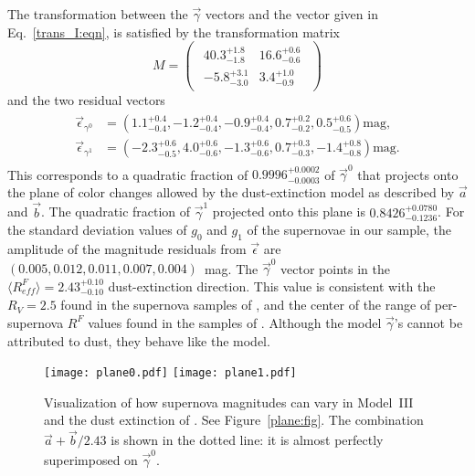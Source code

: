 \documentclass[trackchanges]{aastex62}   	%
\begin{document}
The transformation between the $\vec{\gamma}$  vectors and the    vector given in
Eq.~\ref{trans_I:eqn}, is satisfied by the transformation matrix
\begin{equation}
M=
\begin{pmatrix}
\begin{array}{rr}
40.3^{+1.8}_{-1.8} & 16.6^{+0.6}_{-0.6} \\
-5.8^{+3.1}_{-3.0} & 3.4^{+1.0}_{-0.9}
\end{array}
\end{pmatrix} 
\end{equation}
and the two residual vectors
\begin{align}
\begin{split}
\vec{\epsilon}_{\gamma^0} &=\left(1.1^{+0.4}_{-0.4} , -1.2^{+0.4}_{-0.4} , -0.9^{+0.4}_{-0.4} , 0.7^{+0.2}_{-0.2} , 0.5^{+0.6}_{-0.5}\right) \text{mag}, \\
\vec{\epsilon}_{\gamma^1} & =\left(-2.3^{+0.6}_{-0.5} , 4.0^{+0.6}_{-0.6} , -1.3^{+0.6}_{-0.6} , 0.7^{+0.3}_{-0.3} , -1.4^{+0.8}_{-0.8}\right) \text{mag}.
\end{split}
\label{res_3:eqn}
\end{align}
This corresponds to a quadratic fraction of $0.9996^{+0.0002}_{-0.0003}$ of $\vec{\gamma}^0$ that projects onto the plane of
color changes allowed by the  dust-extinction model
as described by
$\vec{a}$ and $\vec{b}$. The quadratic fraction of $\vec{\gamma}^1$ projected
onto this plane is
$0.8426^{+0.0780}_{-0.1236}$.
For the standard deviation values of $g_0$ and $g_1$ of the supernovae in our sample, the amplitude of the magnitude residuals from $\vec{\epsilon}$ are 
$\left(0.005, 0.012,0.011, 0.007, 0.004 \right)$~mag.
The   $\vec{\gamma}^0$  vector points in the $\langle R^F_{\mathit{eff}}\rangle=2.43^{+0.10}_{-0.10}$ dust-extinction direction.
This value is consistent with the $R_V=2.5$ found in the supernova samples of \citet{2011ApJ...729...55F}, and the
center  of the range of per-supernova $R^F$ values found in the samples of \citet{2014ApJ...789...32B, 2015MNRAS.453.3300A}.
Although the model $\vec{\gamma}$'s cannot be attributed to dust, they behave like the    model.

\begin{figure}[htbp] %
   \centering
   \texttt{[image: plane0.pdf]}
   \texttt{[image: plane1.pdf]}
   \caption{
   Visualization of how supernova magnitudes can vary in Model~III and the dust extinction of .
   See Figure~\ref{plane:fig}.
   The combination $\vec{a}+\vec{b}/2.43$ is shown in the dotted 
   line: it is almost perfectly superimposed on $\vec{\gamma}^0$.
   \label{plane3:fig}}
\end{figure}
\end{document}

